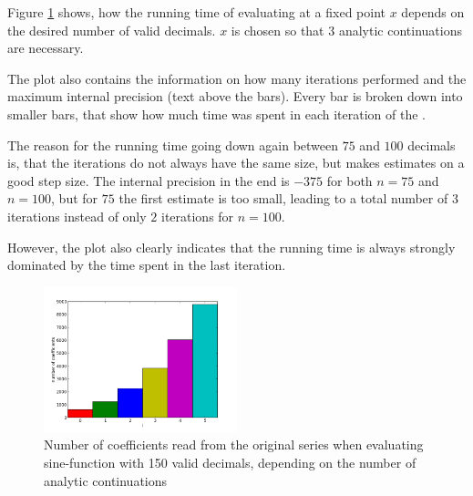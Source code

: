 		Figure \ref{fig:sin dep on n} shows, how the running time of evaluating at a fixed point $x$ depends on the desired number of valid decimals. 
		$x$ is chosen so that $3$ analytic continuations are necessary. 

		The plot also contains the information on how many iterations \irram performed and the maximum internal 
		precision (text above the bars). 
		Every bar is broken down into smaller bars, that show how much time was spent in each iteration of the \irram.

		The reason for the running time going down again between $75$ and $100$ decimals is, that
		the iterations do not always have the same size, but \irram makes estimates on a good step size.
		The internal precision in the end is $-375$ for both $n=75$ and $n=100$, but 
		for $75$ the first estimate is too small, leading to a total number of $3$ iterations instead of only $2$ iterations for $n=100$.

		However, the plot also clearly indicates that the running time is always strongly dominated by the time spent in the last iteration.

		\begin{figure}[h]
			\centering
			\includegraphics[width=0.5\textwidth]{img/analytic/sin_for_coeffs_prec_150_dep_on_series.png}
			\caption{Number of coefficients read from the original series when evaluating sine-function with 150 valid decimals, depending on the number of analytic continuations}
			\label{fig:sin dep on n}
		\end{figure}


